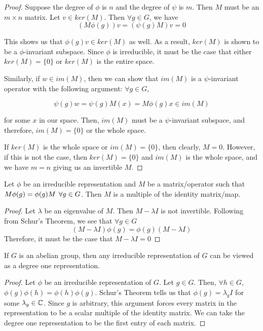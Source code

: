 \begin{proof}Suppose the degree of $\phi$ is $n$ and the degree of $\psi$ is $m$. Then $M$ must be an $m\times n$ matrix. Let $v\in ker(M)$. Then $\forall g \in G$, we have 
\begin{equation}
	 (M\phi(g))v= (\psi(g)M)v = 0
\end{equation}

This shows us that $\phi(g)v \in ker(M)$ as well. As a result, $ker(M)$ is shown to be a $\phi$-invariant subspace. Since $\phi$ is irreducible, it must be the case that either $ker(M) =\{0\}$ or $ker(M)$ is the entire space.  

Similarly, if $w \in im(M)$, then we can show that $im(M)$ is a $\psi$-invariant operator with the following argument: $\forall g\in G$,

\begin{equation}
	\psi(g)w =\psi(g)M(x) = M\phi(g)x \in im(M)
\end{equation}

for some $x$ in our space. Then, $im(M)$ must be a $\psi$-invariant subspace, and therefore, $im(M) = \{0\}$ or the whole space.

If $ker(M)$ is the whole space or $im(M) = \{0\}$, then clearly, $M=0$. However, if this is not the case, then $ker(M) = \{0\}$ and $im(M)$ is the whole space, and we have $m=n$ giving us an invertible $M$. \end{proof}

\begin{corrolary}
	Let $\phi$ be an irreducible representation and $M$ be a matrix/operator such that $M\phi(g)=\phi(g)M \hspace{1.5mm}\forall g \in G$. Then $M$ is a multiple of the identity matrix/map.
\end{corrolary}

\begin{proof}\cite{Mendes} Let $\lambda$ be an eigenvalue of $M$. Then $M - \lambda I$ is not invertible. Following from Schur's Theorem, we see that $\forall g \in G$
$$(M-\lambda I)\phi(g) = \phi(g) (M-\lambda I)$$
Therefore, it must be the case that $M-\lambda I = 0$ \end{proof}

\begin{corrolary}
	If $G$ is an abelian group, then any irreducible representation of $G$ can be viewed as a degree one representation.
\end{corrolary}

\begin{proof}\cite{Tung} Let $\phi$ be an irreducible representation of $G$. Let $g \in G$. Then, $\forall h \in G$, $\phi(g)\phi(h) = \phi(h)\phi(g)$. Schur's Theorem tells us that $\phi(g) = \lambda_g I$ for some $\lambda_g \in \mathbb{C}$. Since $g$ is arbitrary, this argument forces every matrix in the representation to be a scalar multiple of the identity matrix. We can take the degree one representation to be the first entry of each matrix.  \end{proof}

